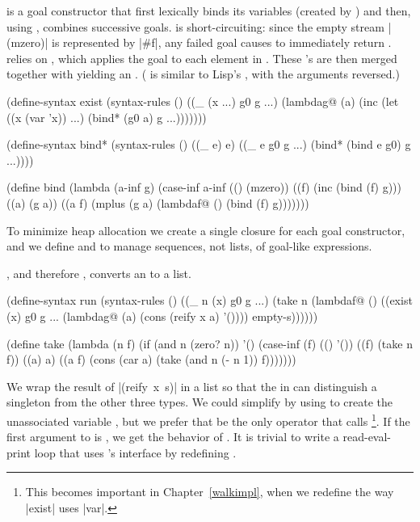  is a goal
constructor that first lexically binds its variables (created by
) and then, using , combines successive goals.
 is short-circuiting: since the empty stream
\mbox{\scheme|(mzero)|} is represented by \mbox{\scheme|#f|}, any
failed goal causes  to immediately return .
 relies on  \cite{moggi91notions,Wadler92},
which applies the goal  to each element in 
.  These 's are then merged together with
 yielding an .  ( is
similar to Lisp's , with the arguments reversed.)

\schemedisplayspace
\begin{schemedisplay}
(define-syntax exist
  (syntax-rules ()
    ((_ (x ...) g0 g ...)
     (lambdag@ (a)
       (inc
         (let ((x (var 'x)) ...)
           (bind* (g0 a) g ...)))))))
\end{schemedisplay}

\begin{schemedisplay}
(define-syntax bind*
  (syntax-rules ()
    ((_ e) e)
    ((_ e g0 g ...) (bind* (bind e g0) g ...))))

(define bind
  (lambda (a-inf g)
    (case-inf a-inf
      (() (mzero))
      ((f) (inc (bind (f) g)))
      ((a) (g a))
      ((a f) (mplus (g a) (lambdaf@ () (bind (f) g)))))))
\end{schemedisplay}

To minimize heap allocation we create a single
 closure for each goal constructor,
and we define  and  to
manage sequences, not lists, of goal-like expressions.  

, and therefore , converts an  to a
list.  

\schemedisplayspace
\begin{schemedisplay}
(define-syntax run
  (syntax-rules ()
    ((_ n (x) g0 g ...)
     (take n
       (lambdaf@ ()
         ((exist (x) g0 g ... 
            (lambdag@ (a)
              (cons (reify x a) '())))
          empty-s))))))

(define take
  (lambda (n f)
    (if (and n (zero? n)) 
      '()
      (case-inf (f)
        (() '())
        ((f) (take n f))
        ((a) a)
        ((a f) (cons (car a) (take (and n (- n 1)) f)))))))
\end{schemedisplay}

\noindent
We wrap the result of \mbox{\scheme|(reify x s)|} in a list 
so that the  in  can distinguish a
singleton  from the other three  types.
We could simplify  by using  to create
the unassociated variable , but we prefer that  be the
only operator that calls \footnote{This becomes important in 
Chapter~\ref{walkimpl}, when we redefine the way \scheme|exist| uses \scheme|var|.}.
If the first argument to  is , we get the
behavior of .  It is trivial to write a read-eval-print
loop that uses 's interface by redefining .


